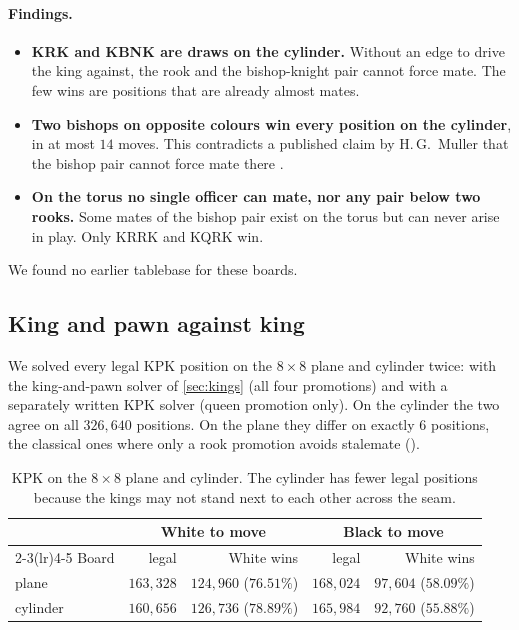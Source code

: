 \paragraph{Findings.}
\begin{itemize}
\item \textbf{KRK and KBNK are draws on the cylinder.} Without an edge to drive the king against, the rook and
  the bishop-knight pair cannot force mate. The few wins are positions that are already almost mates.
\item \textbf{Two bishops on opposite colours win every position on the cylinder}, in at most $14$ moves. This
  contradicts a published claim by H.\,G.~Muller that the bishop pair cannot force mate there \citep{MullerCylinder}.
\item \textbf{On the torus no single officer can mate, nor any pair below two rooks.} Some mates of the
  bishop pair exist on the torus but can never arise in play. Only KRRK and KQRK win.
\end{itemize}
We found no earlier tablebase for these boards.

\subsection{King and pawn against king}\label{sec:kpk}

We solved every legal KPK position on the $8\times8$ plane and cylinder twice: with the king-and-pawn solver of
\cref{sec:kings} (all four promotions) and with a separately written KPK solver (queen promotion only). On the
cylinder the two agree on all $326{,}640$ positions. On the plane they differ on exactly $6$ positions, the
classical ones where only a rook promotion avoids stalemate ().

\begin{table}[ht]
\centering\small
\begin{tabular}{@{}lrrrr@{}}
\toprule
& \multicolumn{2}{c}{White to move} & \multicolumn{2}{c}{Black to move} \\
\cmidrule(lr){2-3}\cmidrule(lr){4-5}
Board & legal & White wins & legal & White wins \\
\midrule
plane & $163{,}328$ & $124{,}960$ ($76.51\%$) & $168{,}024$ & $97{,}604$ ($58.09\%$) \\
cylinder & $160{,}656$ & $126{,}736$ ($78.89\%$) & $165{,}984$ & $92{,}760$ ($55.88\%$) \\
\bottomrule
\end{tabular}
\caption{KPK on the $8\times8$ plane and cylinder. The cylinder has fewer legal positions because the kings
may not stand next to each other across the seam.}
\label{tab:kpk}
\end{table}

